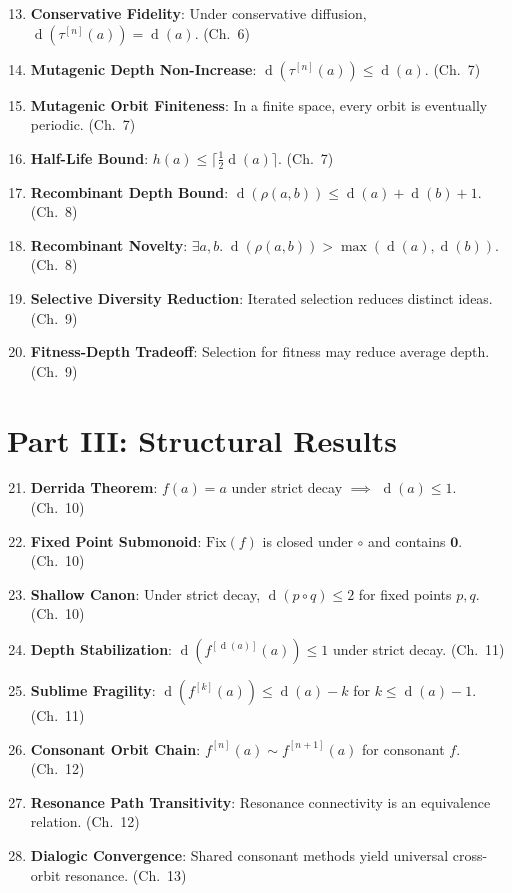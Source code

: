 \documentclass[11pt,openany]{book}
\theoremstyle{definition}
\theoremstyle{plain}
\theoremstyle{remark}
\newcommand{\compose}{\circ}                 %
\newcommand{\void}{\mathbf{0}}              %
\newcommand{\res}{\sim}                      %
\newcommand{\depth}{\operatorname{d}}       %
\newcommand{\transmit}{\tau}                 %
\begin{document}
\begin{enumerate}
\setcounter{enumi}{12}
\item \textbf{Conservative Fidelity}: Under conservative diffusion, $\depth(\transmit^{[n]}(a)) = \depth(a)$. (Ch.~6)
\item \textbf{Mutagenic Depth Non-Increase}: $\depth(\transmit^{[n]}(a)) \leq \depth(a)$. (Ch.~7)
\item \textbf{Mutagenic Orbit Finiteness}: In a finite space, every orbit is eventually periodic. (Ch.~7)
\item \textbf{Half-Life Bound}: $h(a) \leq \lceil \frac{1}{2}\depth(a) \rceil$. (Ch.~7)
\item \textbf{Recombinant Depth Bound}: $\depth(\rho(a, b)) \leq \depth(a) + \depth(b) + 1$. (Ch.~8)
\item \textbf{Recombinant Novelty}: $\exists a, b.\; \depth(\rho(a,b)) > \max(\depth(a), \depth(b))$. (Ch.~8)
\item \textbf{Selective Diversity Reduction}: Iterated selection reduces distinct ideas. (Ch.~9)
\item \textbf{Fitness-Depth Tradeoff}: Selection for fitness may reduce average depth. (Ch.~9)
\end{enumerate}

\section{Part III: Structural Results}

\begin{enumerate}
\setcounter{enumi}{20}
\item \textbf{Derrida Theorem}: $f(a) = a$ under strict decay $\implies$ $\depth(a) \leq 1$. (Ch.~10)
\item \textbf{Fixed Point Submonoid}: $\mathrm{Fix}(f)$ is closed under $\compose$ and contains $\void$. (Ch.~10)
\item \textbf{Shallow Canon}: Under strict decay, $\depth(p \compose q) \leq 2$ for fixed points $p, q$. (Ch.~10)
\item \textbf{Depth Stabilization}: $\depth(f^{[\depth(a)]}(a)) \leq 1$ under strict decay. (Ch.~11)
\item \textbf{Sublime Fragility}: $\depth(f^{[k]}(a)) \leq \depth(a) - k$ for $k \leq \depth(a) - 1$. (Ch.~11)
\item \textbf{Consonant Orbit Chain}: $f^{[n]}(a) \res f^{[n+1]}(a)$ for consonant $f$. (Ch.~12)
\item \textbf{Resonance Path Transitivity}: Resonance connectivity is an equivalence relation. (Ch.~12)
\item \textbf{Dialogic Convergence}: Shared consonant methods yield universal cross-orbit resonance. (Ch.~13)
\end{enumerate}
\end{document}
